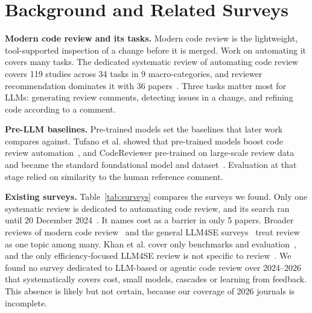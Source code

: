 \section{Background and Related Surveys}\label{sec:background}
\textbf{Modern code review and its tasks.} Modern code review is the lightweight, tool-supported inspection of a change before it is merged. Work on automating it covers many tasks. The dedicated systematic review of automating code review covers 119 studies across 34 tasks in 9 macro-categories, and reviewer recommendation dominates it with 36 papers~\cite{tufano2025automating}. Three tasks matter most for LLMs: generating review comments, detecting issues in a change, and refining code according to a comment.

\textbf{Pre-LLM baselines.} Pre-trained models set the baselines that later work compares against. Tufano et al. showed that pre-trained models boost code review automation~\cite{tufano2022using}, and CodeReviewer pre-trained on large-scale review data and became the standard foundational model and dataset~\cite{li2022codereviewer}. Evaluation at that stage relied on similarity to the human reference comment.

\textbf{Existing surveys.} Table~\ref{tab:surveys} compares the surveys we found. Only one systematic review is dedicated to automating code review, and its search ran until 20 December 2024~\cite{tufano2025automating}. It names cost as a barrier in only 5 papers. Broader reviews of modern code review~\cite{yang2025roadmap,badampudi2023modern,davila2021systematic} and the general LLM4SE surveys~\cite{hou2023large,zhang2023survey,fan2023large} treat review as one topic among many. Khan et al. cover only benchmarks and evaluation~\cite{khan2026survey}, and the only efficiency-focused LLM4SE review is not specific to review~\cite{shi2024efficient}. We found no survey dedicated to LLM-based or agentic code review over 2024--2026 that systematically covers cost, small models, cascades or learning from feedback. This absence is likely but not certain, because our coverage of 2026 journals is incomplete.

